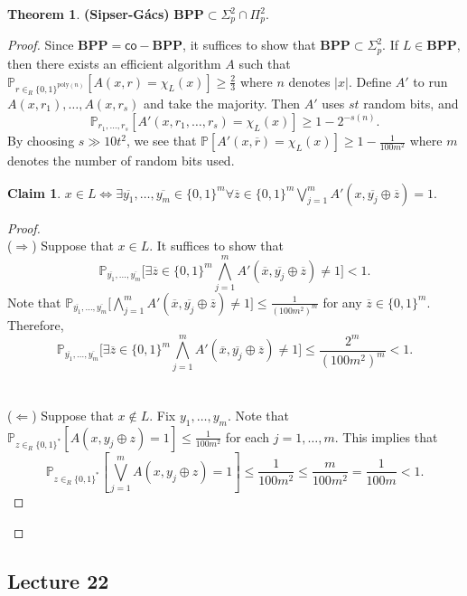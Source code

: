 \documentclass[10pt,letterpaper,cm]{nupset}
\theoremstyle{definition}
\newtheorem{claim}{Claim}
\newtheorem{theorem}{Theorem}
\newcommand{\1}{\mathbf{1}}
\newcommand{\0}{\vec 0}
\begin{document}
\begin{theorem}{\textbf{(Sipser-G\'acs)}}
$\mathbf{BPP} \subset \Sigma^2_p \cap \Pi^2_p$.
\end{theorem}
\begin{proof}
Since $\mathbf{BPP} = \mathsf{co}{-}\mathbf{BPP}$, it suffices to show that $\mathbf{BPP} \subset \Sigma^2_p$. If $L \in \mathbf{BPP}$, then there exists an efficient algorithm $A$ such that $\mathbb{P}_{r \in_R \{0,1\}^{\text{poly}(n)}}[A(x,r) = \chi_L(x)] \geq \frac{2}{3}$ where $n$ denotes $|x|$. Define $A'$ to run $A(x, r_1), \ldots, A(x, r_s)$ and take the majority. Then $A'$ uses $st$ random bits, and $$\mathbb{P}_{r_1, \ldots, r_s}[A'(x, r_1, \ldots, r_s) =\chi_L(x)] \geq 1 - 2^{{-}s(n)}.$$ By choosing $s \gg 10t^2$, we see that $\mathbb{P}[A'(x, \overline{r}) = \chi_L(x)] \geq 1 -\frac{1}{100m^2}$ where $m$ denotes the number of random bits used. 
\begin{claim}
$x \in L \iff \exists \overline{y_1}, \ldots, \overline{y_m} \in \{0,1\}^m \forall \overline{z} \in \{0,1\}^m \bigvee_{j=1}^m A'(x, \overline{y_j} \oplus \overline{z})=1$.
\end{claim}
\begin{proof} $ $
\\ ($\Longrightarrow$) Suppose that $x \in L$. It suffices to show that $$   \mathbb{P}_{\overline{y_1}, \ldots, \overline{y_m}} \big [\exists \overline{z} \in \{0,1\}^m \bigwedge_{j=1}^m A'(\overline{x}, \overline{y_j} \oplus \overline{z}) \ne 1 \big ] <1   .$$ Note that $\mathbb{P}_{\overline{y_1}, \ldots, \overline{y_m}} \big [\bigwedge_{j=1}^m  A'(\overline{x}, \overline{y_j} \oplus \overline{z}) \ne 1 \big  ] \leq \frac{1}{(100m^2)^m}$ for any $\overline{z} \in \{0,1\}^m$. Therefore, $$      \mathbb{P}_{\overline{y_1}, \ldots, \overline{y_m}} \big [\exists \overline{z} \in \{0,1\}^m \bigwedge_{j=1}^m A'(\overline{x}, \overline{y_j} \oplus \overline{z}) \ne 1 \big ]   \leq \frac{2^m}{(100m^2)^m} <1.$$
\\ \\
($\Longleftarrow$)  Suppose that $x \notin L$. Fix $y_1, \ldots, y_m$. Note that $\mathbb{P}_{z \in_R \{0,1\}^{\ast}}[A(x, y_j \oplus z) =1] \leq \frac{1}{100m^2}$ for each $j=1, \ldots, m$. This implies that $$\mathbb{P}_{z \in_R \{0,1\}^{\ast}}[\bigvee_{j=1}^m A(x, y_j \oplus z) =1] \leq \frac{1}{100m^2} \leq \frac{m}{100m^2} = \frac{1}{100m} <1.$$
\end{proof}
\end{proof}

\subsection{Lecture 22}
\end{document}
